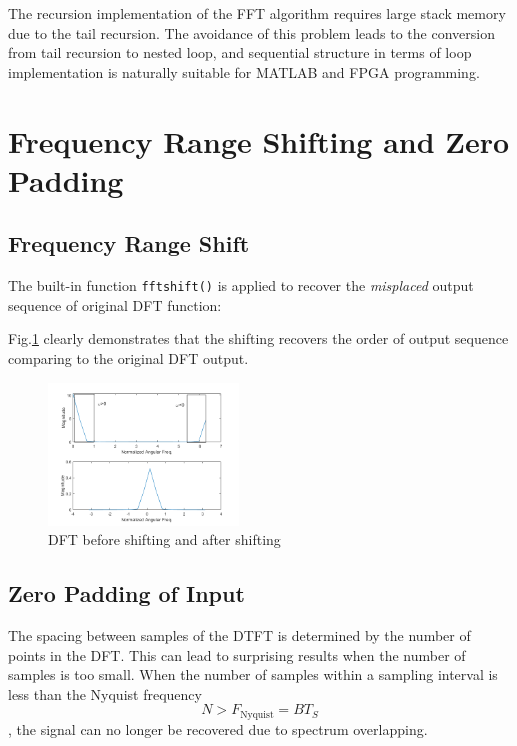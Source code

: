 \documentclass[conference]{IEEEtran}
\begin{document}
The recursion implementation of the FFT algorithm requires large stack memory due to the tail recursion. The avoidance of this problem leads to the conversion from tail recursion to nested loop, and sequential structure in terms of loop implementation is naturally suitable for MATLAB and FPGA programming.

\section{Frequency Range Shifting and Zero Padding}
\subsection{Frequency Range Shift}
The built-in function \lstinline{fftshift()} is applied to recover the \textit{misplaced} output sequence of original DFT function:



Fig.\ref{fig:p521.png} clearly demonstrates that the shifting recovers the order of output sequence comparing to the original DFT output.

\begin{figure}[htpb]
	\centering
	\includegraphics[width=0.45\textwidth]{p521.png}
	\caption{DFT before shifting and after shifting}
	\label{fig:p521.png}
\end{figure}

\subsection{Zero Padding of Input}
The spacing between samples of the DTFT is determined by the number of points in the DFT. This can lead to surprising results when the number of samples is too small. When the number of samples within a sampling interval is less than the Nyquist frequency
\begin{equation}
	N>F_{\text{Nyquist}}=BT_{S}
\end{equation}
, the signal can no longer be recovered due to spectrum overlapping.
\end{document}
